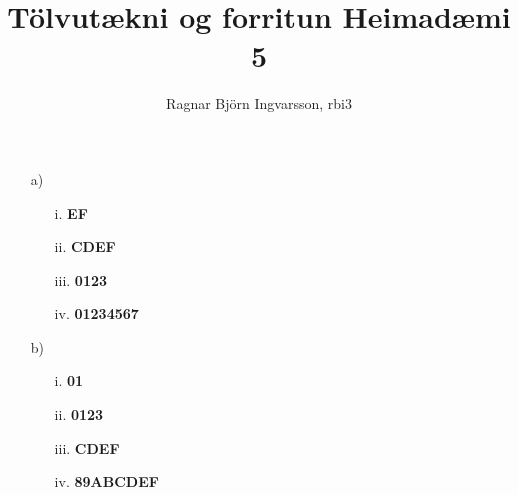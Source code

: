 \documentclass{article}
\title{Tölvutækni og forritun Heimadæmi 5}
\author{Ragnar Björn Ingvarsson, rbi3}
\begin{document}
\renewcommand\thepage{}
	
	\maketitle

	\newpage
	\setcounter{page}{1}
	\renewcommand\thepage{\arabic{page}}

	\section{}
	\begin{itemize}
		\item[a)] 
			\begin{itemize}
				\item[i.] \textbf{EF}
				\item[ii.] \textbf{CDEF}
				\item[iii.] \textbf{0123}
				\item[iv.] \textbf{01234567}
			\end{itemize}
		\item[b)]
			\begin{itemize}
				\item[i.] \textbf{01}
				\item[ii.] \textbf{0123}
				\item[iii.] \textbf{CDEF}
				\item[iv.] \textbf{89ABCDEF}
			\end{itemize}
	\end{itemize}
\end{document}
